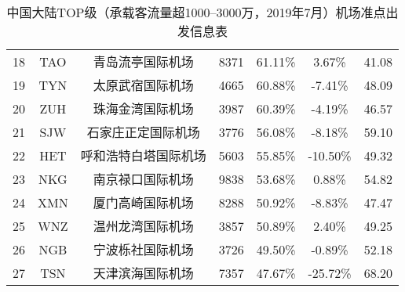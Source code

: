 \begin{table}
{\begin{tabular}{ccccccc}
            18 & TAO & 青岛流亭国际机场 & 8371 & 61.11\% & 3.67\% & 41.08 \\
            \rowcolor[HTML]{EFEFEF}
            19 & TYN & 太原武宿国际机场 & 4665 & 60.88\% & -7.41\% & 48.09 \\
            20 & ZUH & 珠海金湾国际机场 & 3987 & 60.39\% & -4.19\% & 46.57 \\
            \rowcolor[HTML]{EFEFEF}
            21 & SJW & 石家庄正定国际机场 & 3776 & 56.08\% & -8.18\% & 59.10 \\
            22 & HET & 呼和浩特白塔国际机场 & 5603 & 55.85\% & -10.50\% & 49.32 \\
            \rowcolor[HTML]{EFEFEF}
            23 & NKG & 南京禄口国际机场 & 9838 & 53.68\% & 0.88\% & 54.82 \\
            24 & XMN & 厦门高崎国际机场 & 8288 & 50.92\% & -8.83\% & 47.47 \\
            \rowcolor[HTML]{EFEFEF}
            25 & WNZ & 温州龙湾国际机场 & 3857 & 50.89\% & 2.40\% & 49.25 \\
            26 & NGB & 宁波栎社国际机场 & 3726 & 49.50\% & -0.89\% & 52.18 \\
            \rowcolor[HTML]{EFEFEF}
            27 & TSN & 天津滨海国际机场 & 7357 & 47.67\% & -25.72\% & 68.20 \\ \hline
        \end{tabular}%
    }
    \caption{中国大陆TOP级（承载客流量超1000--3000万，2019年7月）机场准点出发信息表}\label{T:depart_2_2}
\end{table}


